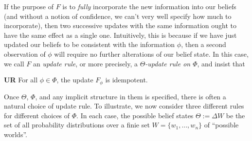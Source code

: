 \documentclass{uai2023} %
\begin{document}
If the purpose of $F$ is to \emph{fully} incorporate the new information into our beliefs
(and without a notion of confidence, we can't very well specify how much to incorporate),
then
two successive updates with the same information ought to have the same effect as a single one.
Intuitively, this is because if we have just updated our beliefs to be consistent with the information $\phi$, then a second observation of $\phi$ will require no further alterations of our belief state.
In this case, we call $F$ an \emph{update rule}, or more precisely, a \emph{$\Theta$-update rule on $\Phi$}, and insist that
\begin{CFaxioms}
	\item[\textbf{UR}] For all $\phi \in \Phi$, the update $F_\phi$ is
	idempotent.
\end{CFaxioms}


Once $\Theta$, $\Phi$, and any implicit structure in them is specified, there is often a natural choice of update rule.
To illustrate, we now consider three different rules for different choices of $\Phi$.
In each case, the possible belief states $\Theta := \Delta W$ be the set of all probability distributions over a finie set $W = \{w_1, \ldots, w_n\}$ of ``possible worlds''.
\end{document}
